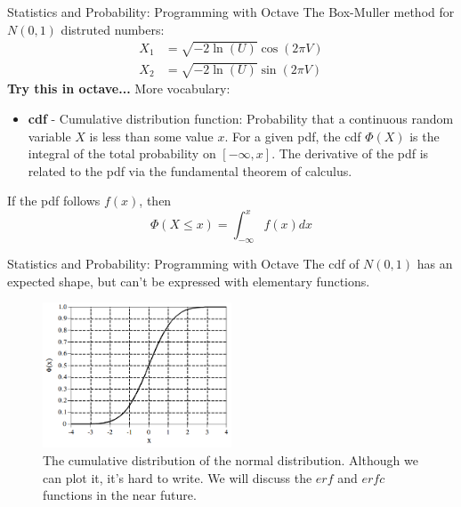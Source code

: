 \documentclass{beamer}
\begin{document}
\begin{frame}[fragile]{Statistics and Probability: Programming with Octave}
\small
The Box-Muller method for $N(0,1)$ distruted numbers:
\begin{align}
X_1 &= \sqrt{-2\ln(U)}\cos(2\pi V) \\
X_2 &= \sqrt{-2\ln(U)}\sin(2\pi V)
\end{align}
\textbf{Try this in octave...}
More vocabulary:
\begin{itemize}
\item \textbf{cdf} - Cumulative distribution function: Probability that a continuous random variable $X$ is less than some value $x$.  For a given pdf, the cdf $\Phi(X)$ is the integral of the total probability on $[-\infty,x]$.  The derivative of the pdf is related to the pdf via the fundamental theorem of calculus.
\end{itemize}
If the pdf follows $f(x)$, then 
\begin{equation}
\Phi(X\leq x) = \int_{-\infty}^{x} f(x) dx
\end{equation}
\end{frame}

\begin{frame}[fragile]{Statistics and Probability: Programming with Octave}
The cdf of $N(0,1)$ has an expected shape, but can't be expressed with elementary functions.
\begin{figure}
\centering
\includegraphics[width=0.5\textwidth]{figures/cdfgaus.png}
\caption{\label{fig:cdfgaus} The cumulative distribution of the normal distribution.  Although we can plot it, it's hard to write.  We will discuss the $erf$ and $erfc$ functions in the near future.}
\end{figure}
\end{frame}
\end{document}

